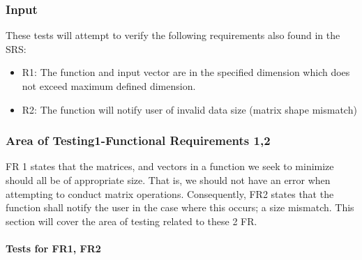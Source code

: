 \documentclass[12pt, titlepage]{article}
\begin{document}
\subsubsection{Input}
These tests will attempt to verify the following requirements also found in the SRS:
\begin{itemize}
  \item R1: The function and input vector are in the specified dimension which does not exceed
  maximum defined dimension.
  \item R2: The function will notify user of invalid data size (matrix shape mismatch)
\end{itemize}
\subsubsection{Area of Testing1-Functional Requirements 1,2}
FR 1 states that the matrices, and vectors in a function we seek to minimize should all be
of appropriate size. That is, we should not have an error when attempting to conduct matrix 
operations. Consequently, FR2 states that the function shall notify the user in the case where 
this occurs; a size mismatch. This section will cover the area of testing related to these 2 FR. 
		
\paragraph{Tests for FR1, FR2}
\end{document}
